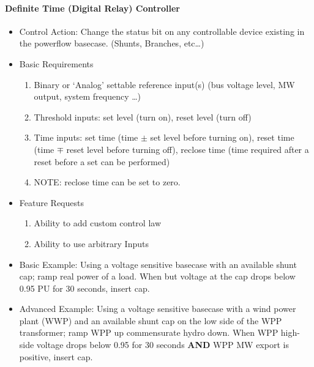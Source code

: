 \documentclass[12pt]{article}
\begin{document}
\begin{multicols}{2}
\vfill\null
\columnbreak

\paragraph{Definite Time (Digital Relay) Controller}
\begin{itemize}
	\item Control Action: Change the status bit on any controllable device existing in the powerflow basecase. (Shunts, Branches, etc\ldots)
	\item Basic Requirements
	\begin{enumerate}
		\item Binary or `Analog' settable reference input(s) (bus voltage level, MW output, system frequency \ldots) 
		\item Threshold inputs: set level (turn on), reset level (turn off)
		\item Time inputs: set time (time $\pm$ set level before turning on), reset time (time $\mp$ reset level before turning off), reclose time (time required after a reset before a set can be performed)
		\item NOTE: reclose time can be set to zero.
	\end{enumerate}
	\item Feature Requests
	\begin{enumerate}
		\item Ability to add custom control law
		\item Ability to use arbitrary Inputs
	\end{enumerate}
	\item Basic Example: Using a voltage sensitive basecase with an available shunt cap; ramp real power of a load. When but voltage at the cap drops below 0.95 PU for 30 seconds, insert cap.
	\item Advanced Example: Using a voltage sensitive basecase with a wind power plant (WWP) and an available shunt cap on the low side of the WPP transformer; ramp WPP up commensurate hydro down. When WPP high-side voltage drops below 0.95 for 30 seconds \textbf{AND} WPP MW export is positive, insert cap.
\end{itemize}

\vfill\null

\end{multicols}
\end{document}
